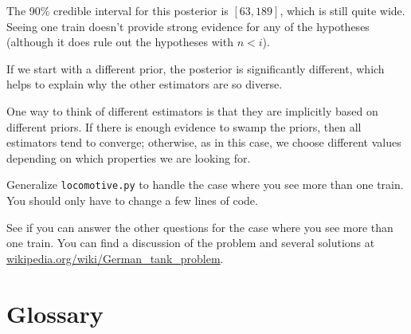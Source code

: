 \documentclass[12pt]{book}
\begin{document}
The 90\% credible interval for this posterior is $[63, 189]$, which
is still quite wide.  Seeing one train doesn't provide strong evidence
for any of the hypotheses (although it does rule out the hypotheses
with $n < i$).

If we start with a different prior, the posterior is significantly
different, which helps to explain why the other estimators are so
diverse.

One way to think of different estimators is that they are implicitly
based on different priors.  If there is enough evidence to swamp
the priors, then all estimators tend to converge; otherwise, as
in this case, we choose different values depending on which properties
we are looking for.

\begin{ex}

Generalize \verb"locomotive.py" to handle the case where you
see more than one train.  You should only have to
change a few lines of code.

\end{ex}


\begin{ex}

See if you can answer the other questions for the case where you
see more than one train.  You can find a discussion of the problem
and several solutions at
\url{wikipedia.org/wiki/German_tank_problem}.

\end{ex}

\section{Glossary}
\end{document}
